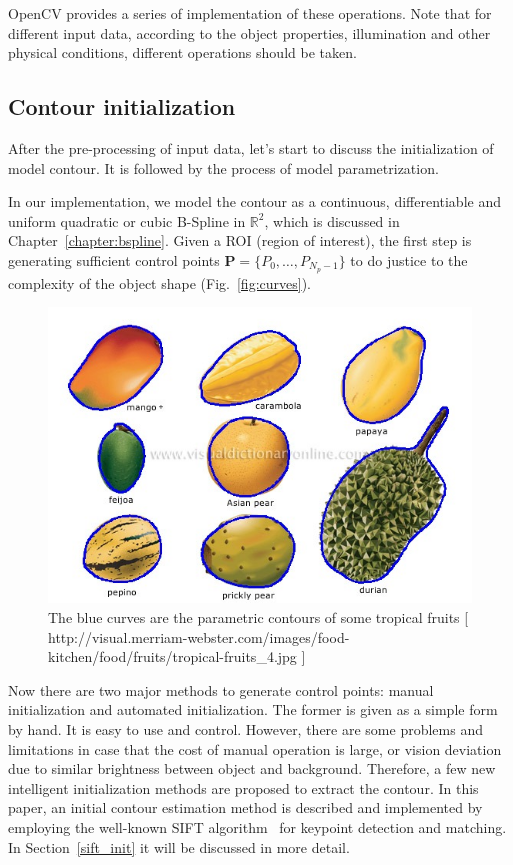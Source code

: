 OpenCV provides a series of implementation of these operations. Note
that for different input data, according to the object properties,
illumination and other physical conditions, different operations
should be taken. 

\subsection{Contour initialization}
\label{sec:mp}

After the pre-processing of input data, let's start to discuss the
initialization of model contour. It is followed by the process of
model parametrization.

In our implementation, we model the
contour as a continuous, differentiable and uniform quadratic or cubic
B-Spline in $\mathbb{R}^2$, which is discussed in Chapter~\ref{chapter:bspline}. 
Given a ROI (region of interest), the first step is generating
sufficient control points $\mathbf{P} = \{P_0, \ldots, P_{N_p-1}\}$ to
do justice to the complexity of the object shape
(Fig.~\ref{fig:curves}).

\begin{figure}[htb]
  \centering
  \includegraphics[width=\linewidth]{images/curves.jpg}
\caption[The parametric of some tropical fruits]{The blue curves are
  the parametric contours of some tropical fruits [\\
  http://visual.merriam-webster.com/images/food-kitchen/food/fruits/tropical-fruits\_4.jpg
  ]}
\label{fig:prior}
\end{figure}

Now there are two major methods to generate control points:
manual initialization and automated initialization. The former is
given as a simple form by hand. It is easy to use and
control. However, there are some problems and limitations in case that
the cost of manual operation is large, or vision deviation due to
similar brightness between object and background. Therefore, a few new
intelligent initialization methods are proposed to extract the
contour.
In this paper, an initial contour estimation method is described and
implemented by employing the well-known SIFT algorithm~\cite{lowe2004distinctive} for
keypoint detection and matching. In Section~\ref{sift_init} it will be discussed in
more detail.

